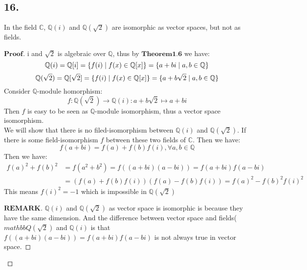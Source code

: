 \documentclass[a4paper, 11pt]{article}
\newenvironment{myprf}
{\renewcommand\qedsymbol{$ $}\begin{proof}[$\textbf{Proof}$]}
  {\end{proof}}
\newenvironment{myremark}
{\renewcommand\qedsymbol{$ $}\begin{proof}[$\textbf{REMARK}$]}
  {\end{proof}}
\begin{document}
 \subsection*{16.}
 In the field $\mathbb{C}$, $\mathbb{Q}(i)$ and $\mathbb{Q}(\sqrt{2})$ are isomorphic as vector spaces, but not
 as fields.
 \begin{myprf}
         i and $\sqrt{2}$ is algebraic over $\mathbb{Q}$, thus by $\textbf{Theorem1.6}$ we have:
         $$
         \mathbb{Q}(i)=
         \mathbb{Q}[i]=\{f(i)\mid f(x)\in \mathbb{Q}[x]\}=\{a+bi\mid a,b\in \mathbb{Q}\} \\
         $$
         $$
         \mathbb{Q}(\sqrt{2})=
         \mathbb{Q}[\sqrt{2}]=\{f(i)\mid f(x)\in \mathbb{Q}[x]\}=\{a+b\sqrt{2}\mid a,b\in \mathbb{Q}\}\\
         $$ 
         Consider $\mathbb{Q}$-module homorphism:
         $$
         f:
         \mathbb{Q}(\sqrt{2})\rightarrow \mathbb{Q}(i):a+b\sqrt{2}
         \mapsto a+bi
         $$ Then $f$ is easy to be seen as $\mathbb{Q}$-module isomorphism, thus a vector space isomorphism.\\
         We will show that there is no filed-isomorphism between $\mathbb{Q}(i)$ and $\mathbb{Q}(\sqrt{2})$.
         If there is some field-isomorphism $f$ between these two fields of $\mathbb{C}$. Then we have:
         $$
         f(a+bi)=f(a)+f(b)f(i), \forall a,b\in \mathbb{Q}
         $$ Then we have:
         $$
         \begin{aligned}
                 f(a)^2+f(b)^2&=f(a^2+b^2)=f((a+bi)(a-bi))=f(a+bi)f(a-bi)\\&=(f(a)+f(b)f(i))(f(a)-f(b)f(i))=f(a)^2-f(b)^2f(i)^2
         \end{aligned}
         $$ This means $f(i)^2=-1$ which is impossible in $\mathbb{Q}(\sqrt{2})$
         \begin{myremark}
                 $\mathbb{Q}(i)$ and $\mathbb{Q}(\sqrt{2})$ as vector space is isomorphic is because they have
                 the same dimension. And the difference between vector space and fields($mathbb{Q}(\sqrt{2})$ and 
                 $\mathbb{Q}(i)$ is that 
                 $f((a+bi)(a-bi))=f(a+bi)f(a-bi)$ is not always true in vector space.
         \end{myremark}

        
         
 \end{myprf}


 
\end{document}
